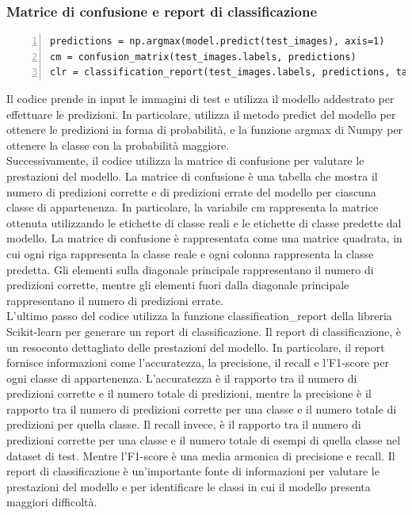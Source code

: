 \documentclass[a4paper,final,12pt]{report}
\begin{document}
\subsubsection{Matrice di confusione e report di classificazione}
\begin{lstlisting}[caption={Codice per la creazione della matrice di confusione e del report di classificazione.}, label={lst:matrice_report}, breaklines, escapechar=`\%, frame=lines, basicstyle=\small\ttfamily, keepspaces=true, numbers=left]
predictions = np.argmax(model.predict(test_images), axis=1)
cm = confusion_matrix(test_images.labels, predictions)
clr = classification_report(test_images.labels, predictions, target_names=test_images.class_indices, zero_division=0)
\end{lstlisting}
Il codice prende in input le immagini di test e utilizza il modello addestrato per effettuare le predizioni. In particolare, utilizza il metodo predict del modello per ottenere le predizioni in forma di probabilità, e la funzione argmax di Numpy per ottenere la classe con la probabilità maggiore.\\
Successivamente, il codice utilizza la matrice di confusione per valutare le prestazioni del modello. La matrice di confusione è una tabella che mostra il numero di predizioni corrette e di predizioni errate del modello per ciascuna classe di appartenenza. In particolare, la variabile cm rappresenta la matrice ottenuta utilizzando le etichette di classe reali e le etichette di classe predette dal modello. La matrice di confusione è rappresentata come una matrice quadrata, in cui ogni riga rappresenta la classe reale e ogni colonna rappresenta la classe predetta. Gli elementi sulla diagonale principale rappresentano il numero di predizioni corrette, mentre gli elementi fuori dalla diagonale principale rappresentano il numero di predizioni errate.\\
L'ultimo passo del codice utilizza la funzione classification\_report della libreria Scikit-learn per generare un report di classificazione.
Il report di classificazione, è un resoconto dettagliato delle prestazioni del modello. In particolare, il report fornisce informazioni come l'accuratezza, la precisione, il recall e l'F1-score per ogni classe di appartenenza. L'accuratezza è il rapporto tra il numero di predizioni corrette e il numero totale di predizioni, mentre la precisione è il rapporto tra il numero di predizioni corrette per una classe e il numero totale di predizioni per quella classe. Il recall invece, è il rapporto tra il numero di predizioni corrette per una classe e il numero totale di esempi di quella classe nel dataset di test. Mentre l'F1-score è una media armonica di precisione e recall. Il report di classificazione è un'importante fonte di informazioni per valutare le prestazioni del modello e per identificare le classi in cui il modello presenta maggiori difficoltà. 
\end{document}
